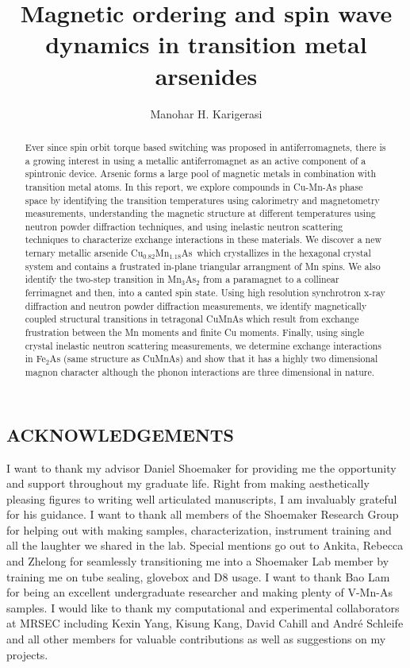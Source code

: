 \documentclass[10pt,doublespacing,edeposit]{uiucthesis2020}
\title{Magnetic ordering and spin wave dynamics in transition metal arsenides}
\author{Manohar H. Karigerasi}
\newcommand*{\cumnas}{Cu$_{0.82}$Mn$_{1.18}$As}
\begin{document}
\maketitle


\begin{frontmatter}

\begin{abstract}
Ever since spin orbit torque based switching was proposed in antiferromagnets, there is a growing interest in using a metallic antiferromagnet as an active component of a spintronic device. Arsenic forms a large pool of magnetic metals in combination with transition metal atoms. In this report, we explore compounds in Cu-Mn-As phase space by identifying the transition temperatures using calorimetry and magnetometry measurements, understanding the magnetic structure at different temperatures using neutron powder diffraction techniques, and using inelastic neutron scattering techniques to characterize exchange interactions in these materials. We discover a new ternary metallic arsenide \cumnas\ which crystallizes in the hexagonal crystal system and contains a frustrated in-plane triangular arrangment of Mn spins. We also identify the two-step transition in Mn$_3$As$_2$ from a paramagnet to a collinear ferrimagnet and then, into a canted spin state. Using high resolution synchrotron x-ray diffraction and neutron powder diffraction measurements, we identify magnetically coupled structural transitions in tetragonal CuMnAs which result from exchange frustration between the Mn moments and finite Cu moments. Finally, using single crystal inelastic neutron scattering measurements, we determine exchange interactions in Fe$_2$As (same structure as CuMnAs) and show that it has a highly two dimensional magnon character although the phonon interactions are three dimensional in nature.
\end{abstract}

\chapter*{\hfill ACKNOWLEDGEMENTS \hfill}

I want to thank my advisor Daniel Shoemaker for providing me the opportunity and support throughout my graduate life. Right from making aesthetically pleasing figures to writing well articulated manuscripts, I am invaluably grateful for his guidance. I want to thank all members of the Shoemaker Research Group for helping out with making samples, characterization, instrument training and all the laughter we shared in the lab. Special mentions go out to Ankita, Rebecca and Zhelong for seamlessly transitioning me into a Shoemaker Lab member by training me on tube sealing, glovebox and D8 usage. I want to thank Bao Lam for being an excellent undergraduate researcher and making plenty of V-Mn-As samples. I would like to thank my computational and experimental collaborators at MRSEC including Kexin Yang, Kisung Kang, David Cahill and Andr\'e Schleife and all other members for valuable contributions as well as suggestions on my projects. 


\end{frontmatter}
\end{document}
